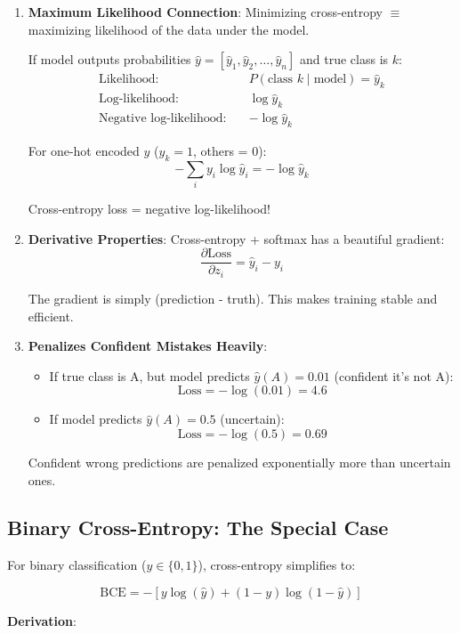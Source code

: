 \documentclass[11pt,oneside]{book}
\begin{document}
\begin{enumerate}
\item \textbf{Maximum Likelihood Connection}: Minimizing cross-entropy $\equiv$ maximizing likelihood of the data under the model.

If model outputs probabilities $\hat{y} = [\hat{y}_1, \hat{y}_2, \ldots, \hat{y}_n]$ and true class is $k$:
\begin{align*}
\text{Likelihood:} \quad & P(\text{class } k \mid \text{model}) = \hat{y}_k \\
\text{Log-likelihood:} \quad & \log \hat{y}_k \\
\text{Negative log-likelihood:} \quad & -\log \hat{y}_k
\end{align*}

For one-hot encoded $y$ ($y_k = 1$, others = 0):
\[
-\sum_{i} y_i \log \hat{y}_i = -\log \hat{y}_k
\]

Cross-entropy loss = negative log-likelihood!

\item \textbf{Derivative Properties}: Cross-entropy + softmax has a beautiful gradient:
\[
\frac{\partial \text{Loss}}{\partial z_i} = \hat{y}_i - y_i
\]

The gradient is simply (prediction - truth). This makes training stable and efficient.

\item \textbf{Penalizes Confident Mistakes Heavily}:
\begin{itemize}
\item If true class is A, but model predicts $\hat{y}(A) = 0.01$ (confident it's not A):
\[
\text{Loss} = -\log(0.01) = 4.6
\]
\item If model predicts $\hat{y}(A) = 0.5$ (uncertain):
\[
\text{Loss} = -\log(0.5) = 0.69
\]
\end{itemize}

Confident wrong predictions are penalized exponentially more than uncertain ones.
\end{enumerate}

\subsection{Binary Cross-Entropy: The Special Case}

For binary classification ($y \in \{0, 1\}$), cross-entropy simplifies to:

\[
\text{BCE} = -[y \log(\hat{y}) + (1-y) \log(1-\hat{y})]
\]

\textbf{Derivation}:
\end{document}
